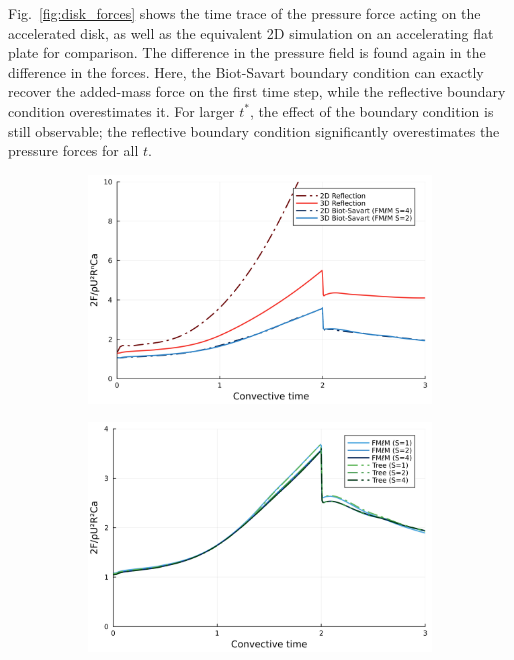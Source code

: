 \documentclass[final,1p,times]{elsarticle}
\begin{document}

Fig.~\ref{fig:disk_forces} shows the time trace of the pressure force acting on the accelerated disk, as well as the equivalent 2D simulation on an accelerating flat plate for comparison. The difference in the pressure field is found again in the difference in the forces. Here, the Biot-Savart boundary condition can exactly recover the added-mass force on the first time step, while the reflective boundary condition overestimates it. For larger $t^*$, the effect of the boundary condition is still observable; the reflective boundary condition significantly overestimates the pressure forces for all $t$. 

\begin{figure}
    \centering
    \begin{subfigure}{.5\textwidth}
        \centering
         \includegraphics[width=\textwidth]{tex//fig/Disk_force_comparison.png}
         \caption{}
    \end{subfigure}%
    \begin{subfigure}{.5\textwidth}
        \centering
        \includegraphics[width=\linewidth]{tex/fig/Disk_force_comparison_methods.png}

\end{subfigure}
\end{figure}
\end{document}
